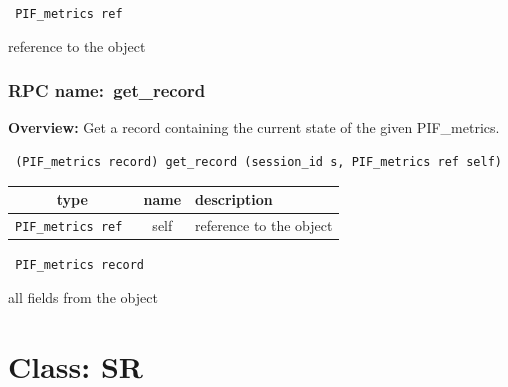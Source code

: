 \vspace{0.3cm}

{\tt 
PIF\_metrics ref
}


reference to the object
\vspace{0.3cm}
\vspace{0.3cm}
\vspace{0.3cm}
\subsubsection{RPC name:~get\_record}

{\bf Overview:} 
Get a record containing the current state of the given PIF\_metrics.

\begin{verbatim} (PIF_metrics record) get_record (session_id s, PIF_metrics ref self)\end{verbatim}



 
\vspace{0.3cm}
\begin{tabular}{|c|c|p{7cm}|}
 \hline
{\bf type} & {\bf name} & {\bf description} \\ \hline
{\tt PIF\_metrics ref } & self & reference to the object \\ \hline 

\end{tabular}

\vspace{0.3cm}

{\tt 
PIF\_metrics record
}


all fields from the object
\vspace{0.3cm}
\vspace{0.3cm}
\vspace{0.3cm}

\vspace{1cm}
\newpage
\section{Class: SR}
